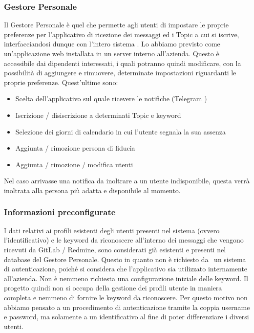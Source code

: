 	\subsubsection{Gestore Personale}\label{TecnologieGestorePersonale}
	Il Gestore Personale è quel  che permette agli utenti di impostare le proprie preferenze per l'applicativo di ricezione dei messaggi ed i Topic a cui si iscrive, interfacciandosi dunque con l'intero sistema \progetto.
	Lo abbiamo previsto come un'applicazione web installata in un server interno all'azienda.
	Questo è accessibile dai dipendenti interessati, i quali potranno quindi modificare, con la possibilità di aggiungere e rimuovere, determinate impostazioni riguardanti le proprie preferenze.
	Quest'ultime sono:
	\begin{itemize}
		\item Scelta dell'applicativo sul quale ricevere le notifiche (Telegram \mail)
		\item Iscrizione / disiscrizione a determinati Topic e keyword
		\item Selezione dei giorni di calendario in cui l'utente segnala la sua assenza
		\item Aggiunta / rimozione persona di fiducia
		\item Aggiunta / rimozione / modifica utenti
	\end{itemize}
	Nel caso arrivasse una notifica da inoltrare a un utente indisponibile, questa verrà inoltrata alla persona più adatta e disponibile al momento.

	\subsubsection{Informazioni preconfigurate}
	I dati relativi ai profili esistenti degli utenti presenti nel sistema (ovvero l'identificativo) e le keyword da riconoscere all'interno dei messaggi che vengono ricevuti da GitLab / Redmine, sono considerati già esistenti e presenti nel database del Gestore Personale.
	Questo in quanto non è richiesto da \II\ un sistema di autenticazione, poiché si considera che l'applicativo sia utilizzato internamente all'azienda.
	Non è nemmeno richiesta una configurazione iniziale delle keyword.
	Il progetto quindi non si occupa della gestione dei profili utente in maniera completa e nemmeno di fornire le keyword da riconoscere.
	Per questo motivo non abbiamo pensato a un procedimento di autenticazione tramite la coppia username e password, ma solamente a un identificativo al fine di poter differenziare i diversi utenti.
